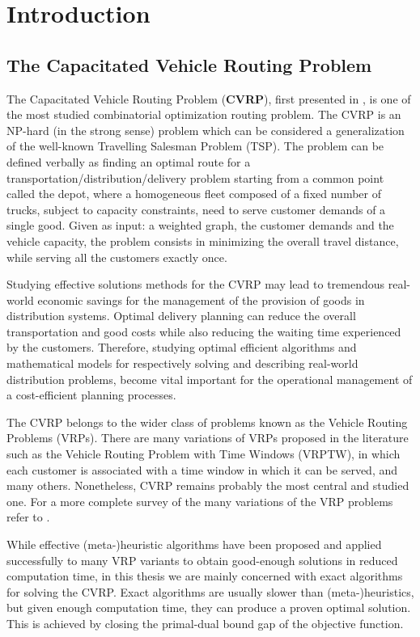 \chapter{Introduction}
\label{sec:introduction-chapter}

\section{The Capacitated Vehicle Routing Problem}
\label{sec:intro-cvrp-problem}

The Capacitated Vehicle Routing Problem (\textbf{CVRP}), first presented in \textcite{dantzig1959},
is one of the most studied combinatorial optimization routing problem.
The CVRP is an NP-hard (in the strong sense) problem which can be considered a generalization
of the well-known Travelling Salesman Problem (TSP).
The problem can be defined verbally as finding an optimal route for a transportation/distribution/delivery problem
starting from a common point called the depot,
where a homogeneous fleet composed of a fixed number of trucks, subject to capacity constraints,
need to serve customer demands of a single good.
Given as input: a weighted graph, the customer demands and the vehicle capacity,
the problem consists in minimizing the overall travel distance,
while serving all the customers exactly once.

Studying effective solutions methods for the CVRP may lead to tremendous real-world economic
savings for the management of the provision of goods in distribution systems.
Optimal delivery planning can reduce the overall transportation and good costs while
also reducing the waiting time experienced by the customers.
Therefore, studying optimal efficient algorithms and mathematical models for
respectively solving and describing real-world distribution problems, become vital
important for the operational management of a cost-efficient planning processes.

The CVRP belongs to the wider class of problems known as the Vehicle Routing Problems (VRPs).
There are many variations of VRPs proposed in the literature such as
the Vehicle Routing Problem with Time Windows (VRPTW), in which
each customer is associated with a time window in which it can be served,
and many others.
Nonetheless, CVRP remains probably the most central and studied one.
For a more complete survey of the many variations of the VRP problems refer to \cite{toth2014}.

While effective (meta-)heuristic algorithms have been proposed and applied
successfully to many VRP variants to obtain good-enough solutions
in reduced computation time, in this thesis we are mainly concerned
with exact algorithms for solving the CVRP.
Exact algorithms are usually slower than (meta-)heuristics, but given
enough computation time, they can produce a proven optimal solution.
This is achieved by closing the primal-dual bound gap of the objective function.

